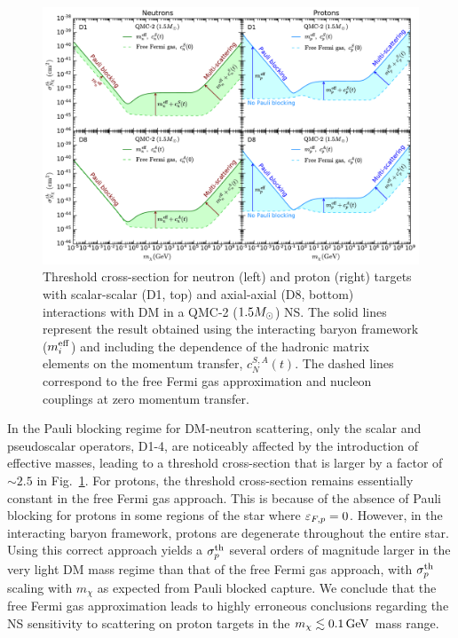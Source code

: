 \begin{figure}[t!bp]
   \centering
\includegraphics[width=\textwidth]{capture_3/sigmath_N_D1_D8.pdf}
\caption[Threshold cross-section for neutron (left) and proton (right) targets with scalar-scalar (D1, top) and axial-axial (D8, bottom) interactions with DM in a QMC-2 ($1.5\Msun$) NS. ]{Threshold cross-section for neutron (left) and proton (right) targets with scalar-scalar (D1, top) and axial-axial (D8, bottom) interactions with DM in a QMC-2 ($1.5\Msun$) NS. 
The solid lines represent the result obtained using the interacting baryon framework ($m_i^{\rm eff}$) and including the dependence of the hadronic matrix elements on the momentum transfer, $c_N^{S,A}(t)$. The dashed lines correspond to the free Fermi gas approximation and nucleon couplings at zero momentum transfer. }
   \label{ch5:fig:sigmathcomp}
\end{figure}


In the Pauli blocking regime for DM-neutron scattering, only the scalar and pseudoscalar operators, D1-4,  are noticeably affected by the introduction of effective masses, leading to a threshold cross-section that is larger by a factor of $\sim2.5$ in Fig.~\ref{ch5:fig:sigmathcomp}. For protons, the threshold cross-section remains essentially constant in the free Fermi gas approach. This is because of the absence of Pauli blocking for protons in some regions of the star where $\varepsilon_{F,p}=0$. However, in the interacting baryon framework, protons are degenerate throughout the entire star. Using this correct approach yields a $\sigma^\mathrm{th}_p$ several orders of magnitude larger in the very light DM mass regime than that of the free Fermi gas approach, with $\sigma^\mathrm{th}_p$ scaling with $m_\chi$ as expected from Pauli blocked capture. 
We conclude that the free Fermi gas approximation leads to highly erroneous conclusions regarding the NS sensitivity to scattering on proton targets in the $m_\chi\lesssim0.1{\rm \,GeV}$ mass range. 

